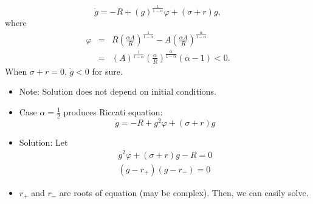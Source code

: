 \documentclass[12pt,compress,handout]{beamer}  %
\begin{document}
\begin{frame}
\begin{equation*}
\dot{g} = -R+(g)^{\frac 1{1-\alpha }}\varphi +(\sigma +r)g,
\end{equation*}
where
\begin{eqnarray*}
\varphi &=& R\left( \frac{\alpha A}R\right) ^{\frac 1{1-\alpha
}}-A\left( \frac{\alpha A}R\right) ^{\frac \alpha {1-\alpha }} \\
&=& (A)^{\frac 1{1-\alpha }}\left( \frac {\alpha}{R}\right) ^{\frac
\alpha {1-\alpha }}(\alpha -1)<0.
\end{eqnarray*}
When $\sigma +r=0$, $\dot{g}<0$ for sure.
\end{frame}


\begin{frame}
\begin{itemize}[<+->]
\item Note: Solution does not depend on initial conditions.

\item Case $\alpha =\frac{1}{2}$ produces Riccati equation:
\begin{equation*}
\dot{g}=-R+g^2\varphi +(\sigma +r)g
\end{equation*}

\item Solution: Let
\begin{gather*}
g^2\varphi +(\sigma +r)g-R=0 \\
(g-r_{+})(g-r_{-})=0
\end{gather*}

\item $r_{+}$ and $r_{-}$ are roots of equation (may be complex). Then, we
    can easily solve.
\end{itemize}
\end{frame}
\end{document}
